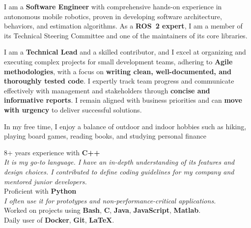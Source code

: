 \documentclass[letterpaper]{soragna-onepage-twocols} %
\begin{document}
\begin{minipage}[t]{0.3\textwidth} %



I am a \textbf{Software Engineer} with comprehensive hands-on experience in autonomous mobile robotics, proven in developing software architecture, behaviors, and estimation algorithms.
As a \textbf{ROS~2 expert}, I am a member of its Technical Steering Committee and one of the maintainers of its core libraries.

I am a \textbf{Technical Lead} and a skilled contributor, and I excel at organizing and executing complex projects for small development teams, adhering to \textbf{Agile methodologies}, with a focus on \textbf{writing clean, well-documented, and thoroughly tested code}.
I expertly track team progress and communicate effectively with management and stakeholders through \textbf{concise and informative reports}.
I remain aligned with business priorities and can \textbf{move with urgency} to deliver successful solutions.

In my free time, I enjoy a balance of outdoor and indoor hobbies such as hiking, playing board games, reading books, and studying personal finance

\sectionspace %



8+ years experience with \textbf{C++}\\
{\emph{It is my go-to language.
I have an in-depth understanding of its features and design choices.
I contributed to define coding guidelines for my company and mentored junior developers.}}\\
Proficient with \textbf{Python}\\
{\emph{I often use it for prototypes and non-performance-critical applications.}}\\
Worked on projects using \textbf{Bash}, \textbf{C}, \textbf{Java}, \textbf{JavaScript},  \textbf{Matlab}.\\
Daily user of \textbf{Docker}, \textbf{Git}, \textbf{LaTeX}.\\


\end{minipage}
\end{document}

